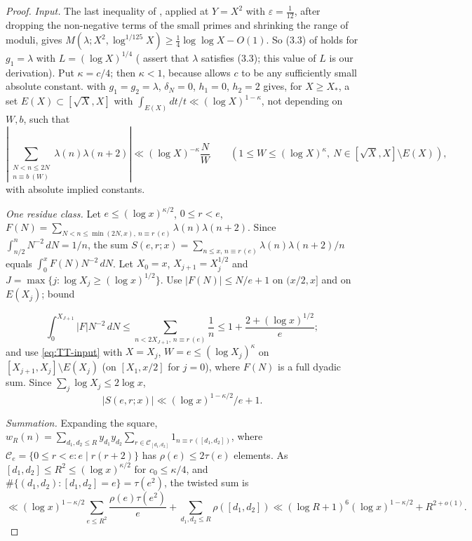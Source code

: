 \documentclass[11pt]{amsart}
\theoremstyle{definition}
\theoremstyle{remark}
\begin{document}
\begin{proof}
\emph{Input.} The last inequality of \cite[(1.12)]{MRT15}, applied at
$Y=X^2$ with $\varepsilon=\frac1{12}$, after dropping the non-negative terms of
the small primes and shrinking the range of moduli, gives
$M(\lambda;X^2,\log^{1/125}X)\ge\frac14\log\log X-O(1)$. So (3.3) of
\cite{TT25} holds for $g_1=\lambda$ with $L=(\log X)^{1/4}$
(\cite[Remarks~3.2]{TT25} assert that $\lambda$ satisfies (3.3); this value of
$L$ is our derivation). Put $\kappa=c/4$; then $\kappa<1$, because
\cite[Theorem~3.1]{TT25} allows $c$ to be any sufficiently small absolute
constant. \cite[Theorem~3.1(ii)]{TT25} with $g_1=g_2=\lambda$, $\delta_N=0$,
$h_1=0$, $h_2=2$ gives, for $X\ge X_*$, a set $E(X)\subset[\sqrt X,X]$ with
$\int_{E(X)}dt/t\ll(\log X)^{1-\kappa}$, not depending on $W,b$, such that
\begin{equation}\label{eq:TT-input}
\left|\sum_{\substack{N<n\le2N\\ n\equiv b\ (W)}}\lambda(n)\lambda(n+2)\right|
\ll(\log X)^{-\kappa}\frac NW
\qquad(1\le W\le(\log X)^{\kappa},\ N\in[\sqrt X,X]\setminus E(X)),
\end{equation}
with absolute implied constants.

\begin{sloppypar}\emph{One residue class.} Let $e\le(\log x)^{\kappa/2}$, $0\le r<e$,
$F(N)=\sum_{N<n\le\min(2N,x),\ n\equiv r\,(e)}\lambda(n)\lambda(n+2)$. Since
$\int_{n/2}^{n}N^{-2}\,dN=1/n$, the sum
$S(e,r;x)=\sum_{n\le x,\,n\equiv r\,(e)}\lambda(n)\lambda(n+2)/n$ equals
$\int_0^xF(N)N^{-2}\,dN$. Let $X_0=x$, $X_{j+1}=X_j^{1/2}$ and
$J=\max\{j:\log X_j\ge(\log x)^{1/2}\}$. Use $|F(N)|\le N/e+1$ on $(x/2,x]$
and on $E(X_j)$; bound\end{sloppypar}
\[\int_0^{X_{J+1}}|F|N^{-2}\,dN\le\sum_{n<2X_{J+1},\,n\equiv r\,(e)}\frac1n\le1+\frac{2+(\log x)^{1/2}}{e};\]
and use \eqref{eq:TT-input} with $X=X_j$,
$W=e\le(\log X_j)^{\kappa}$ on $[X_{j+1},X_j]\setminus E(X_j)$ (on $[X_1,x/2]$
for $j=0$), where $F(N)$ is a full dyadic sum. Since
$\sum_j\log X_j\le2\log x$,
\[
|S(e,r;x)|\ll(\log x)^{1-\kappa/2}/e+1 .
\]

\emph{Summation.} Expanding the square,
$w_R(n)=\sum_{d_1,d_2\le R}y_{d_1}y_{d_2}\sum_{r\in\mathcal C_{[d_1,d_2]}}
1_{n\equiv r\,([d_1,d_2])}$, where $\mathcal C_e=\{0\le r<e:e\mid r(r+2)\}$ has
$\rho(e)\le2\tau(e)$ elements. As $[d_1,d_2]\le R^2\le(\log x)^{\kappa/2}$ for
$c_0\le\kappa/4$, and $\#\{(d_1,d_2):[d_1,d_2]=e\}=\tau(e^2)$, the twisted sum is
\[
\ll(\log x)^{1-\kappa/2}\sum_{e\le R^2}\frac{\rho(e)\tau(e^2)}{e}
+\sum_{d_1,d_2\le R}\rho([d_1,d_2])
\ll(\log R+1)^{6}(\log x)^{1-\kappa/2}+R^{2+o(1)}.
\]


\end{proof}
\end{document}

